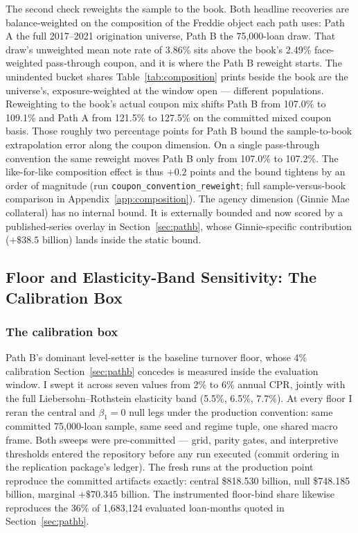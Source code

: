 \documentclass[12pt]{article}
\begin{document}
The second check reweights the sample to the book. Both headline recoveries are balance-weighted on the composition of the Freddie object each path uses: Path A the full 2017--2021 origination universe, Path B the 75,000-loan draw. That draw's unweighted mean note rate of 3.86\% sits above the book's 2.49\% face-weighted pass-through coupon, and it is where the Path B reweight starts. The unindented bucket shares Table~\ref{tab:composition} prints beside the book are the universe's, exposure-weighted at the window open --- different populations. Reweighting to the book's actual coupon mix shifts Path B from 107.0\% to 109.1\% and Path A from 121.5\% to 127.5\% on the committed mixed coupon basis. Those roughly two percentage points for Path B bound the sample-to-book extrapolation error along the coupon dimension. On a single pass-through convention the same reweight moves Path B only from 107.0\% to 107.2\%. The like-for-like composition effect is thus $+0.2$ points and the bound tightens by an order of magnitude (run \texttt{coupon\_convention\_reweight}; full sample-versus-book comparison in Appendix~\ref{app:composition}). The agency dimension (Ginnie Mae collateral) has no internal bound. It is externally bounded and now scored by a published-series overlay in Section~\ref{sec:pathb}, whose Ginnie-specific contribution ($+\$38.5$ billion) lands inside the static bound.

\subsection{Floor and Elasticity-Band Sensitivity: The Calibration Box}\label{sec:robustness-floor}

\subsubsection{The calibration box}

Path B's dominant level-setter is the baseline turnover floor, whose 4\% calibration Section~\ref{sec:pathb} concedes is measured inside the evaluation window. I swept it across seven values from 2\% to 6\% annual CPR, jointly with the full Liebersohn--Rothstein elasticity band (5.5\%, 6.5\%, 7.7\%). At every floor I reran the central and $\beta_1 = 0$ null legs under the production convention: same committed 75,000-loan sample, same seed and regime tuple, one shared macro frame. Both sweeps were pre-committed --- grid, parity gates, and interpretive thresholds entered the repository before any run executed (commit ordering in the replication package's ledger). The fresh runs at the production point reproduce the committed artifacts exactly: central \$818.530 billion, null \$748.185 billion, marginal $+\$70.345$ billion. The instrumented floor-bind share likewise reproduces the 36\% of 1,683,124 evaluated loan-months quoted in Section~\ref{sec:pathb}.
\end{document}
